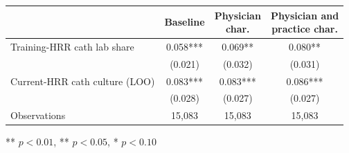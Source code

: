 \begin{threeparttable}
\begin{tabular}{lccc}
\toprule
 & Baseline & \shortstack{Physician\\char.} & \shortstack{Physician and\\practice char.} \\
\midrule
Training-HRR cath lab share & 0.058*** & 0.069** & 0.080** \\
 & (0.021) & (0.032) & (0.031) \\
Current-HRR cath culture (LOO) & 0.083*** & 0.083*** & 0.086*** \\
 & (0.028) & (0.027) & (0.027) \\
\midrule
Observations & 15,083 & 15,083 & 15,083 \\
\bottomrule
\end{tabular}
\begin{tablenotes}[flushleft]
\footnotesize
\item *** $p < 0.01$, ** $p < 0.05$, * $p < 0.10$
\end{tablenotes}
\end{threeparttable}
